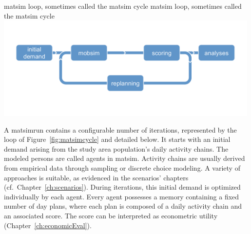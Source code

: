 \createfigure%
{\protect\gls{matsim} loop, sometimes called the \protect\gls{matsim} cycle}%
{\protect\gls{matsim} loop, sometimes called the \protect\gls{matsim} cycle%
}
{\label{fig:matsimcycle}}%
{\includegraphics[width=0.99\textwidth, angle=0]{figures/matsimcycle.pdf}}%
{}

A \gls{matsimrun} contains a configurable number of iterations, represented by the loop of Figure~\ref{fig:matsimcycle} and detailed below. 
%
It starts with an initial demand arising from the \gls{study} area population's daily activity chains. The modeled persons are called agents in \gls{matsim}. Activity chains are usually derived from empirical data through sampling or discrete choice modeling. A variety of approaches is suitable, as evidenced in the scenarios' chapters (cf.\ Chapter~\ref{ch:scenarios}). During iterations, this initial demand is optimized individually by each agent. Every agent possesses a memory containing a fixed number of day plans, where each \gls{plan} is composed of a daily activity chain and an associated \gls{score}.  The score can be interpreted as econometric utility (\cf Chapter~\ref{ch:economicEval}).

